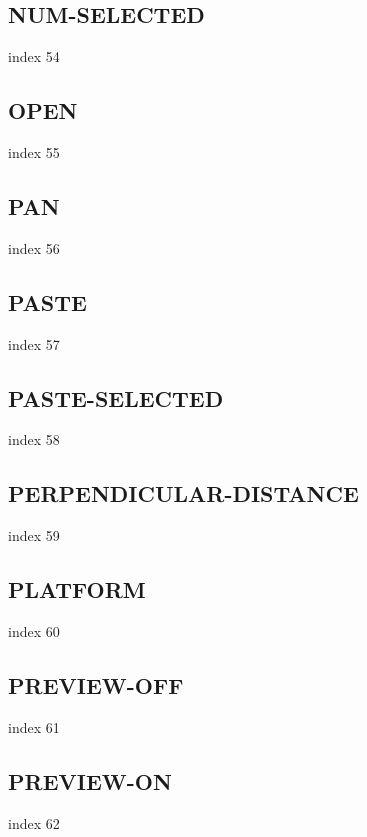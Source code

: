 \documentclass[a4paper]{report}
\begin{document}
\subsection{NUM-SELECTED}

index 54

\subsection{OPEN}

index 55

\subsection{PAN}

index 56

\subsection{PASTE}

index 57

\subsection{PASTE-SELECTED}

index 58

\subsection{PERPENDICULAR-DISTANCE}

index 59

\subsection{PLATFORM}

index 60

\subsection{PREVIEW-OFF}

index 61

\subsection{PREVIEW-ON}

index 62
\end{document}

